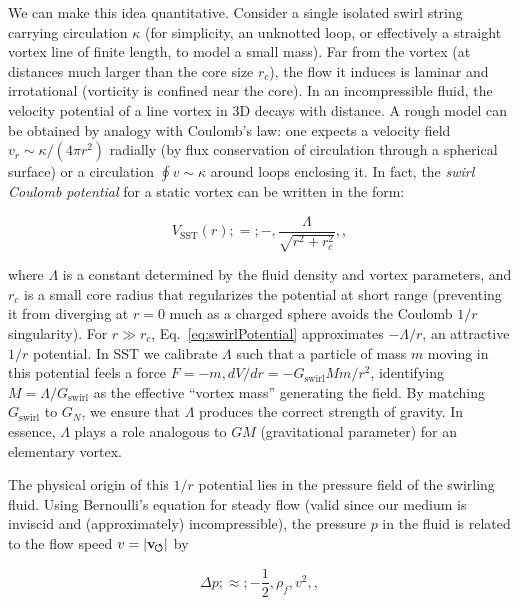 \documentclass[10pt,reprint,aps,onecolumn,nofootinbib]{revtex4-2}
\newcommand{\swirlarrow}{%
    \mathchoice{\mkern-2mu\scriptstyle\boldsymbol{\circlearrowleft}}%
    {\mkern-2mu\scriptstyle\boldsymbol{\circlearrowleft}}%
    {\mkern-2mu\scriptstyle\boldsymbol{\circlearrowleft}}%
    {\mkern-2mu\scriptscriptstyle\boldsymbol{\circlearrowleft}}%
}
\newcommand{\vswirl}{\mathbf{v}_{\swirlarrow}}
\newcommand{\rc}{r_c}                                    %
\providecommand{\rc}{r_c}
\newcommand{\rhoF}{\rho_{\!f}}     %
\begin{document}
We can make this idea quantitative. Consider a single isolated swirl string carrying circulation $\kappa$ (for simplicity, an unknotted loop, or effectively a straight vortex line of finite length, to model a small mass). Far from the vortex (at distances much larger than the core size $\rc$), the flow it induces is laminar and irrotational (vorticity is confined near the core). In an incompressible fluid, the velocity potential of a line vortex in 3D decays with distance. A rough model can be obtained by analogy with Coulomb’s law: one expects a velocity field $v_r \sim \kappa/(4\pi r^2)$ radially (by flux conservation of circulation through a spherical surface) or a circulation $\oint v \sim \kappa$ around loops enclosing it. In fact, the \emph{swirl Coulomb potential} for a static vortex can be written in the form:

\begin{equation}

V_{\text{SST}}(r) ;=; -,\frac{\Lambda}{\sqrt{r^2 + \rc^2}},,

\label{eq:swirlPotential}

\end{equation}

where $\Lambda$ is a constant determined by the fluid density and vortex parameters, and $\rc$ is a small core radius that regularizes the potential at short range (preventing it from diverging at $r=0$ much as a charged sphere avoids the Coulomb $1/r$ singularity). For $r \gg \rc$, Eq.~\eqref{eq:swirlPotential} approximates $-\Lambda/r$, an attractive $1/r$ potential. In SST we calibrate $\Lambda$ such that a particle of mass $m$ moving in this potential feels a force $F = -m,dV/dr = -G_{\text{swirl}} M m / r^2$, identifying $M=\Lambda/G_{\text{swirl}}$ as the effective ``vortex mass'' generating the field. By matching $G_{\text{swirl}}$ to $G_N$, we ensure that $\Lambda$ produces the correct strength of gravity. In essence, $\Lambda$ plays a role analogous to $GM$ (gravitational parameter) for an elementary vortex.


The physical origin of this $1/r$ potential lies in the pressure field of the swirling fluid. Using Bernoulli’s equation for steady flow (valid since our medium is inviscid and (approximately) incompressible), the pressure $p$ in the fluid is related to the flow speed $v = |\vswirl|$ by

\begin{equation}

\Delta p ;\approx; -\frac{1}{2},\rhoF, v^2,,

\label{eq:Bernoulli}

\end{equation}
\end{document}
